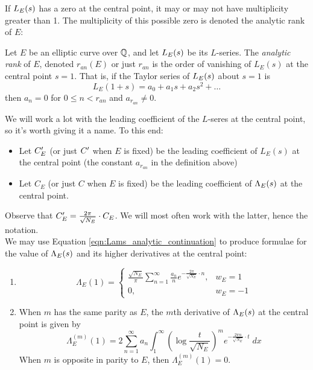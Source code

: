 If $L_E(s)$ has a zero at the central point, it may or may not have multiplicity greater than 1. The multiplicity of this possible zero is denoted the analytic rank of $E$:
\begin{definition}
Let $E$ be an elliptic curve over $\mathbb{Q}$, and let $L_E(s)$ be its $L$-series. The {\it analytic rank} of $E$, denoted $r_{an}(E)$ or just $r_{an}$ is the order of vanishing of $L_E(s)$ at the central point $s=1$. That is, if the Taylor series of $L_E(s)$ about $s=1$ is
\begin{equation}
L_E(1+s) = a_0 + a_1 s + a_2 s^2 + \ldots
\end{equation}
then $a_n = 0$ for $0 \le n < r_{an}$ and $a_{r_{an}} \ne 0$.
\end{definition}
We will work a lot with the leading coefficient of the $L$-seres at the central point, so it's worth giving it a name. To this end:
\begin{definition} \mbox{}
\begin{itemize}
\item Let $C^{\prime}_E$ (or just $C^{\prime}$ when $E$ is fixed) be the leading coefficient of $L_E(s)$ at the central point (the constant $a_{r_{an}}$ in the definition above)
\item Let $C_E$ (or just $C$ when $E$ is fixed) be the leading coefficient of $\Lambda_E(s)$ at the central point.
\end{itemize}
\end{definition}
Observe that $C^{\prime}_E = \frac{2\pi}{\sqrt{N_E}}\cdot C_E$. We will most often work with the latter, hence the notation. \\

We may use Equation \ref{eqn:Lams_analytic_continuation} to produce formulae for the value of $\Lambda_E(s)$ and its higher derivatives at the central point:
\begin{proposition} \mbox{}
\begin{enumerate}
\item \begin{equation}
\Lambda_E(1) = \begin{cases} \frac{\sqrt{N_E}}{\pi} \sum_{n=1}^{\infty}\frac{a_n}{n} e^{-\frac{2\pi}{\sqrt{N_E}}\cdot n}, & w_E = 1 \\ 0, & w_E = -1 \end{cases}
\end{equation}
\item When $m$ has the same parity as $E$, the $m$th derivative of $\Lambda_E(s)$ at the central point is given by
\begin{equation}\label{eqn:central_derivatives}
\Lambda_E^{(m)}(1) = 2 \sum_{n=1}^\infty a_n \int_{1}^{\infty} \left(\log \frac{t}{\sqrt{N_E}}\right)^m e^{-\frac{2\pi n}{\sqrt{N_E}}\cdot t} \; dx
\end{equation}
When $m$ is opposite in parity to $E$, then $\Lambda_E^{(m)}(1) = 0$.
\end{enumerate}
\end{proposition}

